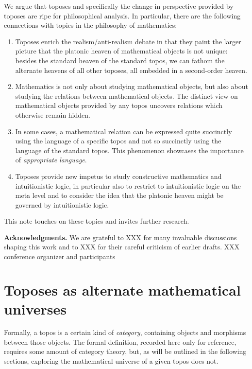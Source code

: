 \documentclass[oneside,reqno]{amsart}
\theoremstyle{definition}
\theoremstyle{plain}
\theoremstyle{remark}
\renewcommand{\_}{\mathpunct{.}\,}
\newcommand{\?}{\,{:}\,}
\renewcommand{\paragraph}[1]{\noindent\textbf{#1.}}
\begin{document}
We argue that toposes and specifically the change in perspective provided by
toposes are ripe for philosophical analysis. In particular, there are the
following connections with topics in the philosophy of mathematics:
\begin{enumerate}
\item Toposes enrich the realism/anti-realism debate in that they paint the larger
picture that the platonic heaven of mathematical objects is not unique: besides
the standard heaven of the standard topos, we can fathom the alternate
heavens of all other toposes, all embedded in a second-order heaven.
\item Mathematics is not only about studying mathematical objects, but also
about studying the relations between mathematical objects. The distinct view
on mathematical objects provided by any topos uncovers relations which
otherwise remain hidden.
\item In some cases, a mathematical relation can be expressed quite succinctly
using the language of a specific topos and not so succinctly using the language
of the standard topos. This phenomenon showcases the importance of
\emph{appropriate language}.
\item Toposes provide new impetus to study constructive mathematics and
intuitionistic logic, in particular also to restrict to intuitionistic
logic on the meta level and to consider the idea that the platonic heaven might
be governed by intuitionistic logic.
\end{enumerate}
This note touches on these topics and invites further research.

\bigskip
\paragraph{Acknowledgments} We are grateful to XXX for many invaluable
discussions shaping this work and to XXX for their careful criticism of earlier
drafts. XXX conference organizer and participants


\section{Toposes as alternate mathematical universes}

Formally, a topos is a certain kind of \emph{category}, containing objects and
morphisms between those objects. The formal definition, recorded here only for
reference, requires some amount of category theory, but, as will be outlined in
the following sections, exploring the mathematical universe of a given topos
does not.
\end{document}

